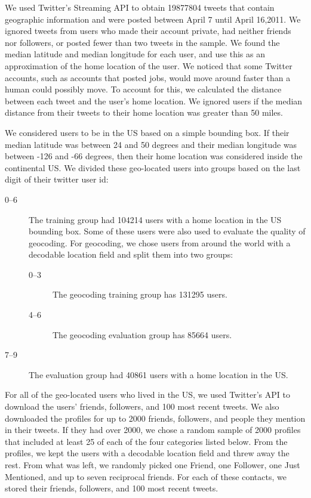 \documentclass{sig-alternate}
\begin{document}
We used Twitter's Streaming API to obtain 19877804 tweets that contain
geographic information and were posted between April 7 until April 16,2011.
We ignored tweets from users who made their account private, had neither
friends nor followers, or posted fewer than two tweets in the sample.
We found the median latitude and median longitude for each user, and use this
as an approximation of the home location of the user.
We noticed that some Twitter accounts, such as accounts that posted jobs, would
move around faster than a human could possibly move. To account for this, we
calculated the distance between each tweet and the user's home location. We
ignored users if the median distance from their tweets to their home location
was greater than 50 miles.

We considered users to be in the US based on a simple bounding box.  If their median latitude was between 24 and 50 degrees and their median longitude was between -126 and -66 degrees, then their home location was considered inside the continental US.
We divided these geo-located users into groups based on the last digit of their twitter user id:
\begin{description}
\item[0--6] The training group had 104214 users with a home location in the US bounding box. Some of these users were also used to evaluate the quality of geocoding. For geocoding, we chose users from around the world with a decodable location field and split them into two groups:
\begin{description}
\item[0--3] The geocoding training group has 131295 users.
\item[4--6] The geocoding evaluation group has 85664 users.
\end{description}
\item[7--9] The evaluation group had 40861 users with a home location in the US.
\end{description}

For all of the geo-located users who lived in the US, we used Twitter's API to download the users' friends, followers, and 100 most recent tweets.
We also downloaded the profiles for up to 2000 friends, followers, and people they mention in their tweets. If they had over 2000, we chose a random sample of 2000 profiles that included at least 25 of each of the four categories listed below.
From the profiles, we kept the users with a decodable location field and threw away the rest. From what was left, we randomly picked one Friend, one Follower, one Just Mentioned, and up to seven reciprocal friends.
For each of these contacts, we stored their friends, followers, and 100 most recent tweets.
\end{document}
